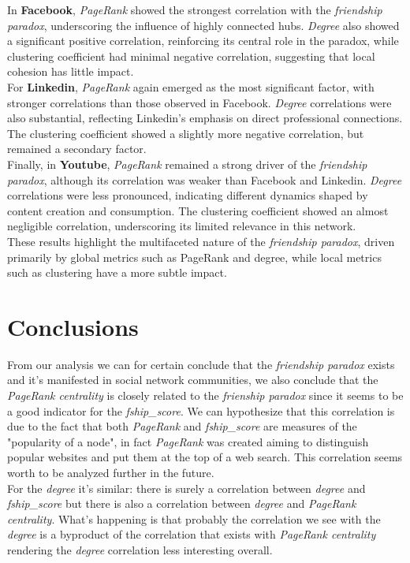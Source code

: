 \documentclass{article}
\begin{document}
In \textbf{Facebook}, \textit{PageRank} showed the strongest correlation with the \textit{friendship paradox}, underscoring the influence of highly connected hubs. \textit{Degree} also showed a significant positive correlation, reinforcing its central role in the paradox, while clustering coefficient had minimal negative correlation, suggesting that local cohesion has little impact. \\
For \textbf{Linkedin}, \textit{PageRank} again emerged as the most significant factor, with stronger correlations than those observed in Facebook. \textit{Degree} correlations were also substantial, reflecting Linkedin's emphasis on direct professional connections. The clustering coefficient showed a slightly more negative correlation, but remained a secondary factor. \\ 
Finally, in \textbf{Youtube}, \textit{PageRank} remained a strong driver of the \textit{friendship paradox}, although its correlation was weaker than Facebook and Linkedin. \textit{Degree} correlations were less pronounced, indicating different dynamics shaped by content creation and consumption. The clustering coefficient showed an almost negligible correlation, underscoring its limited relevance in this network. \\
These results highlight the multifaceted nature of the \textit{friendship paradox}, driven primarily by global metrics such as PageRank and degree, while local metrics such as clustering have a more subtle impact.

\section{Conclusions}
From our analysis we can for certain conclude that the \textit{friendship paradox} exists and it's manifested in social network communities, we also conclude that the \textit{PageRank centrality} is closely related to the \textit{frienship paradox} since it seems to be a good indicator for the \textit{fship\_score}. We can hypothesize that this correlation is due to the fact that both \textit{PageRank} and \textit{fship\_score} are measures of the "popularity of a node", in fact \textit{PageRank} was created aiming to distinguish popular websites and put them at the top of a web search. This correlation seems worth to be analyzed further in the future. \\
For the \textit{degree} it's similar: there is surely a correlation between \textit{degree} and \textit{fship\_score} but there is also a correlation between \textit{degree} and \textit{PageRank centrality}. What's happening is that probably the correlation we see with the \textit{degree} is a byproduct of the correlation that exists with \textit{PageRank centrality} rendering the \textit{degree} correlation less interesting overall.
\end{document}
